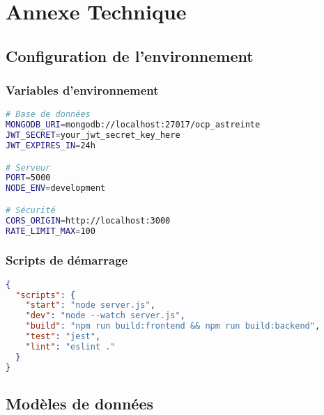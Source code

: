 \appendix
\chapter{Annexe Technique}

\section{Configuration de l'environnement}
\subsection{Variables d'environnement}
\begin{lstlisting}[language=bash, caption=Configuration des variables d'environnement]
# Base de données
MONGODB_URI=mongodb://localhost:27017/ocp_astreinte
JWT_SECRET=your_jwt_secret_key_here
JWT_EXPIRES_IN=24h

# Serveur
PORT=5000
NODE_ENV=development

# Sécurité
CORS_ORIGIN=http://localhost:3000
RATE_LIMIT_MAX=100
\end{lstlisting}

\subsection{Scripts de démarrage}
\begin{lstlisting}[language=json, caption=Scripts package.json]
{
  "scripts": {
    "start": "node server.js",
    "dev": "node --watch server.js",
    "build": "npm run build:frontend && npm run build:backend",
    "test": "jest",
    "lint": "eslint ."
  }
}
\end{lstlisting}

\section{Modèles de données}

